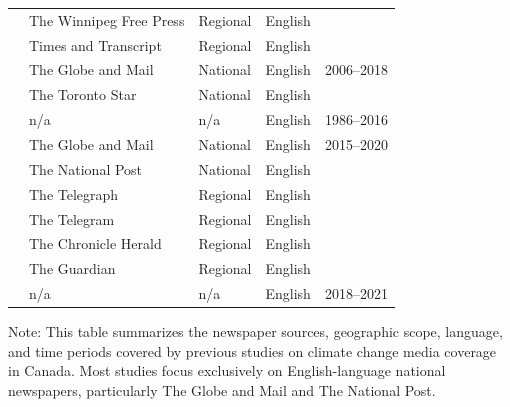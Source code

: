 \documentclass[12pt]{article}
\renewcommand\_{\texttt{\detokenize{_}\allowbreak}}
\begin{document}
{\begin{longtable}{p{5cm}p{6cm}p{4cm}p{3cm}p{3.5cm}}
& The Winnipeg Free Press & Regional & English & \\
& Times and Transcript & Regional & English & \\
\midrule
\textcite{hase_climate_2021} & The Globe and Mail & National & English & 2006--2018 \\
& The Toronto Star & National & English & \\
\midrule
\textcite{sachdeva_themes_2022} & n/a & n/a & English & 1986--2016 \\
\midrule
\textcite{stoddart_what_2023} & The Globe and Mail & National & English & 2015--2020 \\
& The National Post & National & English & \\
& The Telegraph & Regional & English & \\
& The Telegram & Regional & English & \\
& The Chronicle Herald & Regional & English & \\
& The Guardian & Regional & English & \\
\midrule
\textcite{chen_how_2023} & n/a & n/a & English & 2018--2021 \\
\bottomrule
\end{longtable}
}

\vspace{0.5em}
\noindent\footnotesize
Note: This table summarizes the newspaper sources, geographic scope, language, and time periods covered by previous studies on climate change media coverage in Canada. Most studies focus exclusively on English-language national newspapers, particularly The Globe and Mail and The National Post.
\endlandscape
\end{document}
